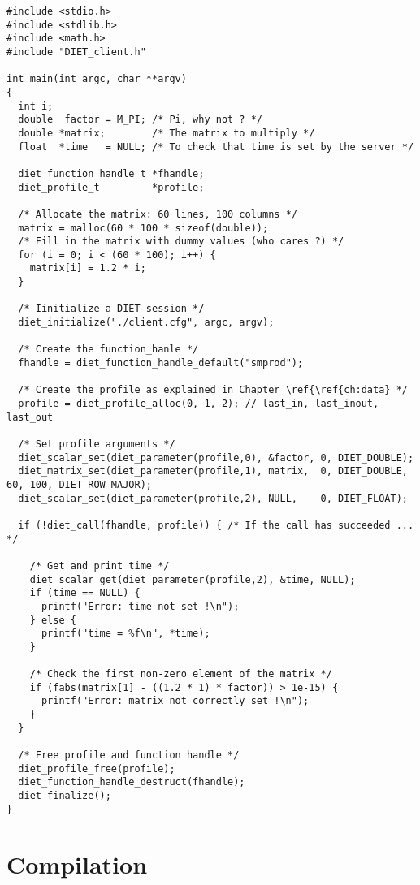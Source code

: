 {\footnotesize
\begin{verbatim}
#include <stdio.h>
#include <stdlib.h>
#include <math.h>
#include "DIET_client.h"

int main(int argc, char **argv)
{
  int i;
  double  factor = M_PI; /* Pi, why not ? */
  double *matrix;        /* The matrix to multiply */
  float  *time   = NULL; /* To check that time is set by the server */

  diet_function_handle_t *fhandle;
  diet_profile_t         *profile;

  /* Allocate the matrix: 60 lines, 100 columns */
  matrix = malloc(60 * 100 * sizeof(double));
  /* Fill in the matrix with dummy values (who cares ?) */
  for (i = 0; i < (60 * 100); i++) {
    matrix[i] = 1.2 * i;
  }
  
  /* Iinitialize a DIET session */
  diet_initialize("./client.cfg", argc, argv);

  /* Create the function_hanle */
  fhandle = diet_function_handle_default("smprod");

  /* Create the profile as explained in Chapter \ref{\ref{ch:data} */
  profile = diet_profile_alloc(0, 1, 2); // last_in, last_inout, last_out
  
  /* Set profile arguments */
  diet_scalar_set(diet_parameter(profile,0), &factor, 0, DIET_DOUBLE);
  diet_matrix_set(diet_parameter(profile,1), matrix,  0, DIET_DOUBLE, 60, 100, DIET_ROW_MAJOR);
  diet_scalar_set(diet_parameter(profile,2), NULL,    0, DIET_FLOAT);
  
  if (!diet_call(fhandle, profile)) { /* If the call has succeeded ... */
     
    /* Get and print time */
    diet_scalar_get(diet_parameter(profile,2), &time, NULL);
    if (time == NULL) {
      printf("Error: time not set !\n");
    } else {
      printf("time = %f\n", *time);
    }

    /* Check the first non-zero element of the matrix */
    if (fabs(matrix[1] - ((1.2 * 1) * factor)) > 1e-15) {
      printf("Error: matrix not correctly set !\n");
    }
  }

  /* Free profile and function handle */
  diet_profile_free(profile);
  diet_function_handle_destruct(fhandle);
  diet_finalize();
}
\end{verbatim}
}


\section{Compilation}
\label{sec:cl_comp}

